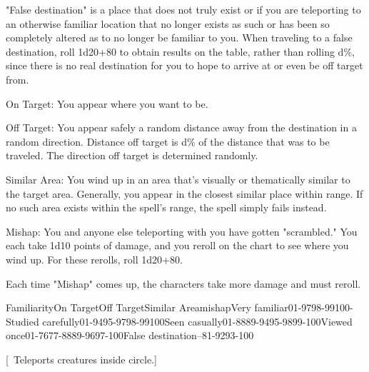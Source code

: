 {"False destination" is a place that does not truly exist or if you are teleporting to an otherwise familiar location that no longer exists as such or has been so completely altered as to no longer be familiar to you. When traveling to a false destination, roll 1d20+80 to obtain results on the table, rather than rolling d\%, since there is no real destination for you to hope to arrive at or even be off target from.

On Target: You appear where you want to be.

Off Target: You appear safely a random distance away from the destination in a random direction. Distance off target is d\% of the distance that was to be traveled. The direction off target is determined randomly.

Similar Area: You wind up in an area that's visually or thematically similar to the target area. Generally, you appear in the closest similar place within range. If no such area exists within the spell's range, the spell simply fails instead.

Mishap: You and anyone else teleporting with you have gotten "scrambled." You each take 1d10 points of damage, and you reroll on the chart to see where you wind up. For these rerolls, roll 1d20+80.

Each time "Mishap" comes up, the characters take more damage and must reroll.

 FamiliarityOn TargetOff TargetSimilar AreamishapVery familiar01-9798-99100-Studied carefully01-9495-9798-99100Seen casually01-8889-9495-9899-100Viewed once01-7677-8889-9697-100False destination--81-9293-100 }
        
[ Teleports creatures inside circle.]
        
